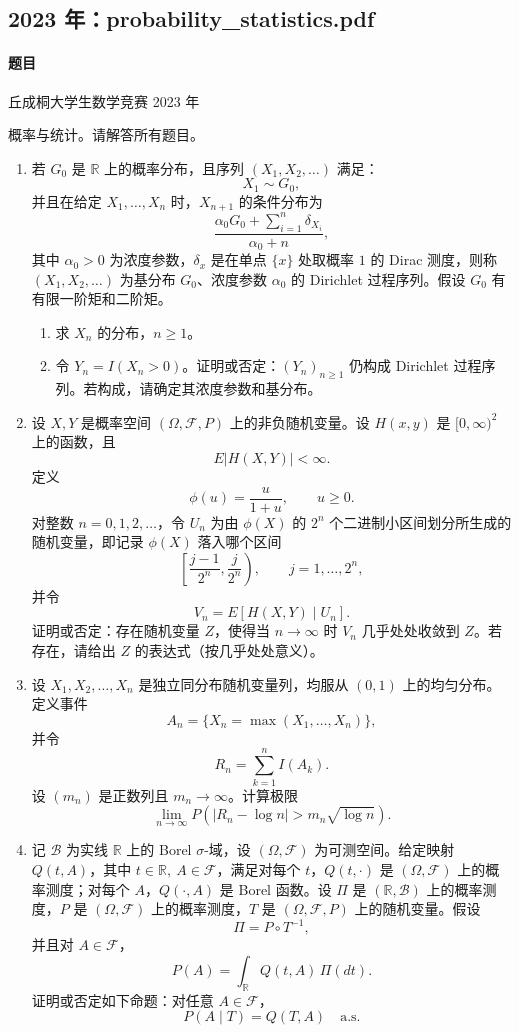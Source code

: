 \documentclass[UTF8,12pt]{ctexart}
\begin{document}
\subsection{2023 年：probability\_statistics.pdf}
\paragraph{题目}
丘成桐大学生数学竞赛 2023 年

概率与统计。请解答所有题目。

\begin{enumerate}[label=\textbf{\arabic*.},leftmargin=2.2em]
\item 若 \(G_0\) 是 \(\mathbb R\) 上的概率分布，且序列 \((X_1,X_2,\ldots)\) 满足：
\[
X_1\sim G_0,
\]
并且在给定 \(X_1,\ldots,X_n\) 时，\(X_{n+1}\) 的条件分布为
\[
\frac{\alpha_0G_0+\sum_{i=1}^n\delta_{X_i}}{\alpha_0+n},
\]
其中 \(\alpha_0>0\) 为浓度参数，\(\delta_x\) 是在单点 \(\{x\}\) 处取概率 \(1\) 的 Dirac 测度，则称 \((X_1,X_2,\ldots)\) 为基分布 \(G_0\)、浓度参数 \(\alpha_0\) 的 Dirichlet 过程序列。假设 \(G_0\) 有有限一阶矩和二阶矩。
\begin{enumerate}[label=\textbf{(\alph*)},leftmargin=2.4em]
\item 求 \(X_n\) 的分布，\(n\ge1\)。
\item 令 \(Y_n=I(X_n>0)\)。证明或否定：\((Y_n)_{n\ge1}\) 仍构成 Dirichlet 过程序列。若构成，请确定其浓度参数和基分布。
\end{enumerate}

\item 设 \(X,Y\) 是概率空间 \((\Omega,\mathcal F,P)\) 上的非负随机变量。设 \(H(x,y)\) 是 \([0,\infty)^2\) 上的函数，且
\[
E|H(X,Y)|<\infty.
\]
定义
\[
\phi(u)=\frac{u}{1+u},\qquad u\ge0.
\]
对整数 \(n=0,1,2,\ldots\)，令 \(U_n\) 为由 \(\phi(X)\) 的 \(2^n\) 个二进制小区间划分所生成的随机变量，即记录 \(\phi(X)\) 落入哪个区间
\[
\left[\frac{j-1}{2^n},\frac{j}{2^n}\right),\qquad j=1,\ldots,2^n,
\]
并令
\[
V_n=E[H(X,Y)\mid U_n].
\]
证明或否定：存在随机变量 \(Z\)，使得当 \(n\to\infty\) 时 \(V_n\) 几乎处处收敛到 \(Z\)。若存在，请给出 \(Z\) 的表达式（按几乎处处意义）。

\item 设 \(X_1,X_2,\ldots,X_n\) 是独立同分布随机变量列，均服从 \((0,1)\) 上的均匀分布。定义事件
\[
A_n=\{X_n=\max(X_1,\ldots,X_n)\},
\]
并令
\[
R_n=\sum_{k=1}^n I(A_k).
\]
设 \((m_n)\) 是正数列且 \(m_n\to\infty\)。计算极限
\[
\lim_{n\to\infty}P\left(|R_n-\log n|>m_n\sqrt{\log n}\right).
\]

\item 记 \(\mathcal B\) 为实线 \(\mathbb R\) 上的 Borel \(\sigma\)-域，设 \((\Omega,\mathcal F)\) 为可测空间。给定映射 \(Q(t,A)\)，其中 \(t\in\mathbb R,\ A\in\mathcal F\)，满足对每个 \(t\)，\(Q(t,\cdot)\) 是 \((\Omega,\mathcal F)\) 上的概率测度；对每个 \(A\)，\(Q(\cdot,A)\) 是 Borel 函数。设 \(\Pi\) 是 \((\mathbb R,\mathcal B)\) 上的概率测度，\(P\) 是 \((\Omega,\mathcal F)\) 上的概率测度，\(T\) 是 \((\Omega,\mathcal F,P)\) 上的随机变量。假设
\[
\Pi=P\circ T^{-1},
\]
并且对 \(A\in\mathcal F\)，
\[
P(A)=\int_{\mathbb R}Q(t,A)\,\Pi(dt).
\]
证明或否定如下命题：对任意 \(A\in\mathcal F\)，
\[
P(A\mid T)=Q(T,A)\quad \text{a.s.}
\]


\end{enumerate}
\end{document}
